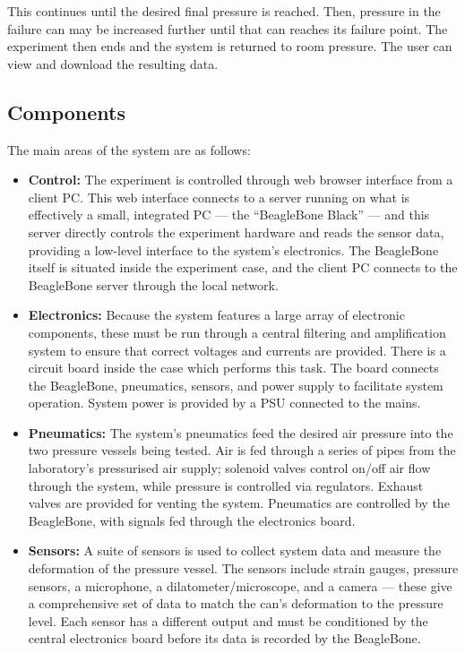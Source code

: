 This continues until the desired final pressure is reached. Then, pressure in the failure can may be increased further until that can reaches its failure point. The experiment then ends and the system is returned to room pressure. The user can view and download the resulting data.

\subsection{Components}

The main areas of the system are as follows:

\begin{itemize}
	\item {\bf Control:} The experiment is controlled through web browser interface from a client PC. This web interface connects to a server running on what is effectively a small, integrated PC --- the ``BeagleBone Black'' --- and this server directly controls the experiment hardware and reads the sensor data, providing a low-level interface to the system's electronics. The BeagleBone itself is situated inside the experiment case, and the client PC connects to the BeagleBone server through the local network.
	\item {\bf Electronics:} Because the system features a large array of electronic components, these must be run through a central filtering and amplification system to ensure that correct voltages and currents are provided. There is a circuit board inside the case which performs this task. The board connects the BeagleBone, pneumatics, sensors, and power supply to facilitate system operation. System power is provided by a PSU connected to the mains.
	\item {\bf Pneumatics:} The system's pneumatics feed the desired air pressure into the two pressure vessels being tested. Air is fed through a series of pipes from the laboratory's pressurised air supply; solenoid valves control on/off air flow through the system, while pressure is controlled via regulators. Exhaust valves are provided for venting the system. Pneumatics are controlled by the BeagleBone, with signals fed through the electronics board.
	\item {\bf Sensors:} A suite of sensors is used to collect system data and measure the deformation of the pressure vessel. The sensors include strain gauges, pressure sensors, a microphone, a dilatometer/microscope, and a camera --- these give a comprehensive set of data to match the can's deformation to the pressure level. Each sensor has a different output and must be conditioned by the central electronics board before its data is recorded by the BeagleBone.


\end{itemize}
